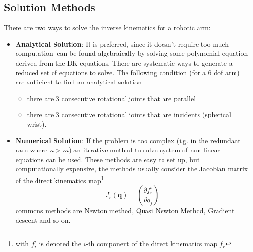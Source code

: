 \documentclass[10pt, letterpaper]{report}
\begin{document}
\subsection{Solution Methods}
There are two ways to solve the inverse kinematics for a robotic arm:\begin{itemize}
    \item \textbf{Analytical Solution}: It is preferred, since it doesn't require too much computation, can be found algebraically by solving some polynomial equation derived from the DK equations. There are systematic ways to generate a reduced set of equations to solve. The following condition (for a 6 dof arm) are sufficient to find an analytical solution\begin{itemize}
        \item there are 3 consecutive rotational joints that are parallel 
        \item there are 3 consecutive rotational joints that are incidents (spherical wrist).
    \end{itemize}
    \item \textbf{Numerical Solution}: If the problem is too complex (i.g. in the redundant case where $n>m$) an iterative method to solve system of non linear equations can be used. These methods are easy to set up, but computationally expensive, the methods usually consider the Jacobian matrix of the direct kinematics map\footnote{
        with $f_r^i$ is denoted the $i$-th component of the direct kinematics map $f_r$
    } $$J_r(\mathbf q)=\left( \frac{\partial f^i_r}{\partial q_j} \right) $$
    commons methods are Newton method, Quasi Newton Method, Gradient descent and so on.
\end{itemize}
\end{document}
